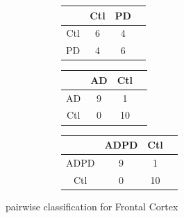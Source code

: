 \begin{figure}[H]
\begin{subfigure}{\textwidth}
 \begin{subfigure}[t]{0.3\textwidth}
  \centering
     \makeatletter{}\makeatother
       \begin{tabular}{cccc} 
	  \hline
    & Ctl & PD \\ 
      \hline
    Ctl &   6 &   4 \\ 
      PD &   4 &   6 \\ 
     \hline
	\end{tabular}
  \end{subfigure}
  \begin{subfigure}[t]{0.3\textwidth}
   \centering
        \makeatletter{}\makeatother
         \begin{tabular}{cccc}        
  \hline
 & AD & Ctl \\ 
  \hline
AD &   9 &   1 \\ 
  Ctl &   0 &  10 \\ 
   \hline
     \hline
     \end{tabular}
   \end{subfigure}
   \begin{subfigure}[t]{0.33\textwidth}
   \centering
        \makeatletter{}\makeatother
         \begin{tabular}{cccc}        
  \hline
 & ADPD & Ctl \\ 
  \hline
ADPD &   9 &   1 \\ 
  Ctl &   0 &  10 \\ 
   \hline
	  \end{tabular}
   \end{subfigure}
\end{subfigure}
\caption{\label{fig4FC} pairwise classification for Frontal Cortex}


\end{figure}
